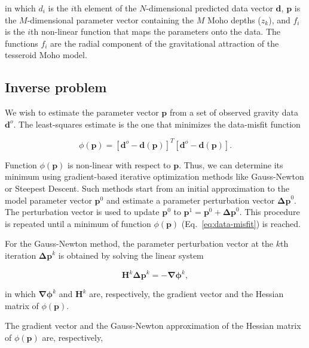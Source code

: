 \documentclass[extra,mreferee]{gji}
\begin{document}
\noindent in which $d_i$ is the $i$th element of the $N$-dimensional predicted
data vector $\mathbf{d}$, $\mathbf{p}$ is the $M$-dimensional parameter vector
containing the $M$ Moho depths ($z_k$),
and $f_i$ is the $i$th non-linear function that maps the parameters onto the
data.
The functions $f_i$ are the radial component of the gravitational attraction
of the tesseroid Moho model.



\subsection{Inverse problem}

We wish to estimate the parameter vector $\mathbf{p}$ from a set of observed
gravity data $\mathbf{d}^o$.
The least-squares estimate is the one that minimizes the data-misfit function

\begin{equation}
    \phi(\mathbf{p}) =
        [\mathbf{d}^o - \mathbf{d}(\mathbf{p})]^T
        [\mathbf{d}^o - \mathbf{d}(\mathbf{p})].
    \label{eq:data-misfit}
\end{equation}

Function $\phi(\mathbf{p})$ is non-linear with respect to $\mathbf{p}$.
Thus, we can determine its minimum using gradient-based
iterative optimization
methods like Gauss-Newton or Steepest Descent.
Such methods start from an initial approximation to the model parameter vector
$\mathbf{p}^0$ and estimate a parameter perturbation vector
$\mathbf{\Delta p}^0$.
The perturbation vector is used to update $\mathbf{p}^0$ to
$\mathbf{p}^1 =  \mathbf{p}^0 + \mathbf{\Delta p}^0$.
This procedure is repeated until a minimum of function $\phi(\mathbf{p})$
(Eq.~\ref{eq:data-misfit}) is reached.

For the Gauss-Newton method,
the parameter perturbation vector at the $k$th iteration $\mathbf{\Delta p}^k$
is obtained by solving the linear system

\begin{equation}
    \mathbf{H}^k\mathbf{\Delta p}^k = -\mathbf{\nabla\phi}^k,
    \label{eq:gaussnewton}
\end{equation}

\noindent in which
$\mathbf{\nabla\phi}^k$ and $\mathbf{H}^k$ are, respectively,
the gradient vector and the Hessian matrix of $\phi(\mathbf{p})$.

The gradient vector and the Gauss-Newton approximation of the Hessian matrix
of $\phi(\mathbf{p})$ are, respectively,
\end{document}
